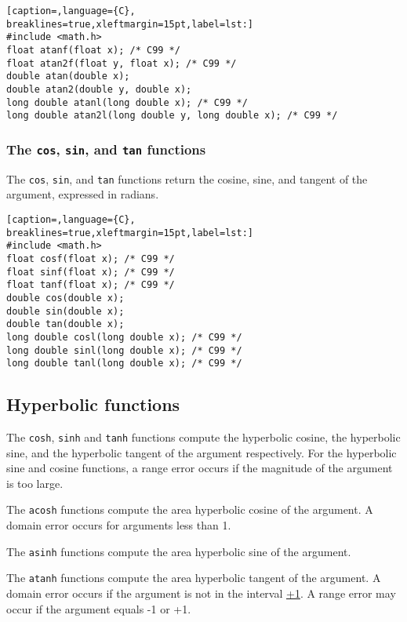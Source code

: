 \lstset{basicstyle=\scriptsize, numbers=left, captionpos=b, tabsize=4}
\begin{lstlisting}[caption=,language={C},
breaklines=true,xleftmargin=15pt,label=lst:]
#include <math.h>
float atanf(float x); /* C99 */
float atan2f(float y, float x); /* C99 */
double atan(double x);
double atan2(double y, double x);
long double atanl(long double x); /* C99 */
long double atan2l(long double y, long double x); /* C99 */
\end{lstlisting}

\subsubsection{The \texttt{cos}, \texttt{sin}, and \texttt{tan} functions}
The \texttt{cos}, \texttt{sin}, and \texttt{tan} functions return the cosine,
sine, and tangent of the argument, expressed in radians.

\lstset{basicstyle=\scriptsize, numbers=left, captionpos=b, tabsize=4}
\begin{lstlisting}[caption=,language={C},
breaklines=true,xleftmargin=15pt,label=lst:]
#include <math.h>
float cosf(float x); /* C99 */
float sinf(float x); /* C99 */
float tanf(float x); /* C99 */
double cos(double x);
double sin(double x);
double tan(double x);
long double cosl(long double x); /* C99 */
long double sinl(long double x); /* C99 */
long double tanl(long double x); /* C99 */
\end{lstlisting}

\subsection{Hyperbolic functions}
The \texttt{cosh}, \texttt{sinh} and \texttt{tanh} functions compute the
hyperbolic cosine, the hyperbolic sine, and the hyperbolic tangent of the
argument respectively. For the hyperbolic sine and cosine functions, a range
error occurs if the magnitude of the argument is too large.

The \texttt{acosh} functions compute the area hyperbolic cosine of the
argument. A domain error occurs for arguments less than 1.

The \texttt{asinh} functions compute the area hyperbolic sine of the argument.

The \texttt{atanh} functions compute the area hyperbolic tangent of the
argument. A domain error occurs if the argument is not in the interval
\href{-1,}{+1}. A range error may occur if the argument equals -1 or +1.

